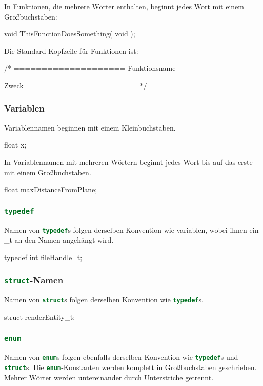 \documentclass{homework-pp}
\renewcommand{\c}[1]{\lstinline[language=c,basicstyle=\ttfamily]|#1|}
\begin{document}
In Funktionen, die mehrere Wörter enthalten, beginnt jedes Wort mit einem Großbuchstaben:

\begin{cblock}
void ThisFunctionDoesSomething( void );
\end{cblock}

Die Standard-Kopfzeile für Funktionen ist:

\begin{cblock}
/*
====================
Funktionsname

Zweck
====================
*/
\end{cblock}

\subsubsection{Variablen}

Variablennamen beginnen mit einem Kleinbuchstaben.

\begin{cblock}
float x;
\end{cblock}

In Variablennamen mit mehreren Wörtern beginnt jedes Wort bis auf das erste mit einem Großbuchstaben.

\begin{cblock}
float maxDistanceFromPlane;
\end{cblock}

\subsubsection{\c{typedef}}

Namen von \c{typedef}s folgen derselben Konvention wie variablen, wobei ihnen ein \_t an den Namen angehängt wird.

\begin{cblock}
typedef int fileHandle_t;
\end{cblock}

\subsubsection{\c{struct}-Namen}

Namen von \c{struct}s folgen derselben Konvention wie \c{typedef}s.

\begin{cblock}
struct renderEntity_t;
\end{cblock}

\subsubsection{\c{enum}}
Namen von \c{enum}s folgen ebenfalls derselben Konvention wie \c{typedef}s und \c{struct}s. Die \c{enum}-Konstanten werden komplett in Großbuchstaben geschrieben. Mehrer Wörter werden untereinander durch Unterstriche getrennt.
\end{document}
